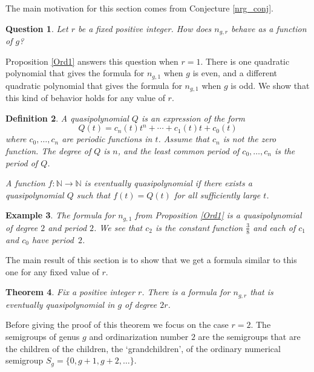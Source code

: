 \documentclass[12pt]{amsart}
\newcommand{\N}{{\mathbb N}}
\theoremstyle{plain}\newtheorem{proposition}{Proposition}[section]
\newtheorem{defn}[proposition]{Definition}
\newtheorem{question}[proposition]{Question}
\newtheorem{thm}[proposition]{Theorem}
\newtheorem{example}[proposition]{Example}
\begin{document}
The main motivation for this section comes from Conjecture \ref{nrg_conj}.
\begin{question}
Let $r$ be a fixed positive integer.  How does $n_{g,r}$ behave as a function of $g$?
\end{question}

Proposition \ref{Ord1} answers this question when $r=1$.  There is one quadratic polynomial that gives the formula for $n_{g,1}$ when $g$ is even, and a different quadratic polynomial that gives the formula for $n_{g,1}$ when $g$ is odd.  We show that this kind of behavior holds for any value of $r$.
\begin{defn}
A \emph{quasipolynomial} $Q$ is an expression of the form
\[
Q(t) = c_n(t) t^n + \cdots + c_1(t) t + c_0(t)
\]
where $c_0,\ldots, c_n$ are periodic functions in $t$.  Assume that $c_n$ is not the zero function.  The \emph{degree} of $Q$ is $n$, and the least common period of $c_0,\ldots, c_n$ is the \emph{period} of $Q$.

A function $f\colon \N \rightarrow \N$ is \emph{eventually quasipolynomial} if there exists a quasipolynomial $Q$ such that $f(t) = Q(t)$ for all sufficiently large $t$.  
\end{defn}

\begin{example}
The formula for $n_{g,1}$ from Proposition \ref{Ord1} is a quasipolynomial of degree $2$ and period $2$.  We see that $c_2$ is the constant function $\frac{3}{8}$ and each of $c_1$ and $c_0$ have period~$2$.
\end{example}
The main result of this section is to show that we get a formula similar to this one for any fixed value of $r$.

\begin{thm}\label{thm:quasi_ord}
Fix a positive integer $r$.  There is a formula for $n_{g,r}$ that is eventually quasipolynomial in $g$ of degree $2r$.
\end{thm}
Before giving the proof of this theorem we focus on the case $r=2$.  The semigroups of genus $g$ and ordinarization number $2$ are the semigroups that are the children of the children, the `grandchildren', of the ordinary numerical semigroup $S_g = \{0,g+1,g+2,\ldots \}$. 
\end{document}

